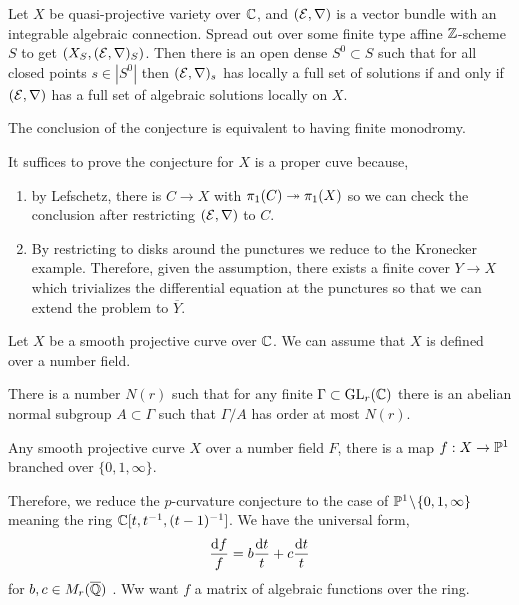 \documentclass[12pt]{article}
\begin{document}
\begin{conj}[Grothendieck]
Let $X$ be quasi-projective variety over $\CC$, and $(\E, \nabla)$ is a vector bundle with an integrable algebraic connection. Spread out over some finite type affine $\Z$-scheme $S$ to get $(X_S, (\E, \nabla)_S)$. Then there is an open dense $S^0 \subset S$ such that for all closed points $s \in |S^0|$ then $(\E, \nabla)_{s}$ has locally a full set of solutions if and only if $(\E, \nabla)$ has a full set of algebraic solutions locally on $X$. 
\end{conj}

\begin{rmk}
The conclusion of the conjecture is equivalent to having finite monodromy. 
\end{rmk}

\begin{rmk}
It suffices to prove the conjecture for $X$ is a proper cuve because,
\begin{enumerate}
\item by Lefschetz, there is $C \to X$ with $\pi_1(C) \onto \pi_1(X)$ so we can check the conclusion after restricting $(\E, \nabla)$ to $C$.
\item By restricting to disks around the punctures we reduce to the Kronecker example. Therefore, given the assumption, there exists a finite \etale cover $Y \to X$ which trivializes the differential equation at the punctures so that we can extend the problem to $\overline{Y}$.
\end{enumerate}
\end{rmk}

\begin{prop}
Let $X$ be a smooth projective curve over $\CC$. We can assume that $X$ is defined over a number field. 
\end{prop}

\begin{prop}[Jordan]
There is a number $N(r)$ such that for any finite $\Gamma \subset \GL_r(\CC)$ there is an abelian normal subgroup $A \subset \Gamma$ such that $\Gamma / A$ has order at most $N(r)$.
\end{prop}

\begin{theorem}[Belyi]
Any smooth projective curve $X$ over a number field $F$, there is a map $f : X \to \P^1$ branched over $\{ 0, 1, \infty \}$. 
\end{theorem}

\begin{cor}
Therefore, we reduce the $p$-curvature conjecture to the case of $\P^1 \sm \{ 0, 1, \infty \}$ meaning the ring $\CC[t, t^{-1}, (t-1)^{-1}]$. We have the universal form,
\[ \frac{\d{f}}{f} = b \frac{\d{t}}{t} + c \frac{\d{t}}{t} \]
for $b, c \in M_r(\overline{\Q})$ . Ww want $f$ a matrix of algebraic functions over the ring. 
\end{cor}
\end{document}
